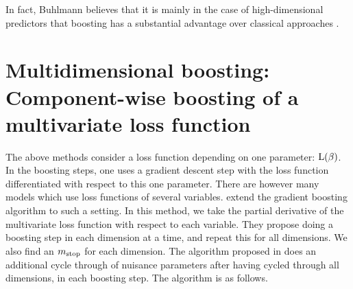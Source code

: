 In fact, Buhlmann believes that it is mainly in the case of high-dimensional predictors that boosting has a substantial advantage over classical approaches \citep{buhlmann2006}.

\section{Multidimensional boosting: Component-wise boosting of a multivariate loss function}
The above methods consider a loss function depending on one parameter: $\operatorname{L}(\beta)$. In the boosting steps, one uses a gradient descent step with the loss function differentiated with respect to this one parameter.
There are however many models which use loss functions of several variables. \cite{schmid} extend the gradient boosting algorithm \citep{friedman2001} to such a setting. In this method, we take the partial derivative of the multivariate loss function with respect to each variable. They propose doing a boosting step in each dimension at a time, and repeat this for all dimensions. We also find an $m_{\text{stop}}$ for each dimension. The algorithm proposed in \cite{schmid} does an additional cycle through of nuisance parameters after having cycled through all dimensions, in each boosting step. The algorithm is as follows.

